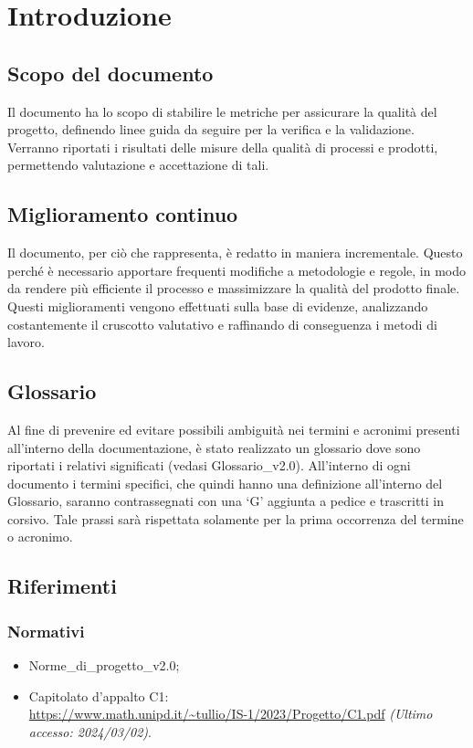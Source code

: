 \chapter{Introduzione}\label{chap:intro}

\section{Scopo del documento}
Il documento ha lo scopo di stabilire le metriche per assicurare la qualità del progetto, definendo linee guida da seguire per la verifica e la validazione. Verranno riportati i risultati delle misure della qualità di processi e prodotti, permettendo valutazione e accettazione di tali.

\section{Miglioramento continuo}
Il documento, per ciò che rappresenta, è redatto in maniera incrementale. Questo perché è necessario apportare frequenti modifiche a metodologie e regole, in modo da rendere più efficiente il processo e massimizzare la qualità del prodotto finale. Questi miglioramenti vengono effettuati sulla base di evidenze, analizzando costantemente il cruscotto valutativo e raffinando di conseguenza i metodi di lavoro.

\section{Glossario}
Al fine di prevenire ed evitare possibili ambiguità nei termini e acronimi presenti all’interno della documentazione, è stato realizzato un glossario dove sono riportati i relativi significati (vedasi Glossario\_v2.0). All’interno di ogni documento i termini specifici, che quindi hanno una definizione all’interno del Glossario, saranno contrassegnati con una ‘G’ aggiunta a pedice e trascritti in corsivo. Tale prassi sarà rispettata solamente per la prima occorrenza del termine o acronimo.

\section{Riferimenti}
\subsection{Normativi}
\begin{itemize}
    \item Norme\_di\_progetto\_v2.0;
    \item Capitolato d'appalto C1: \\ \url{https://www.math.unipd.it/~tullio/IS-1/2023/Progetto/C1.pdf} \textit{(Ultimo accesso: 2024/03/02)}.
\end{itemize}

